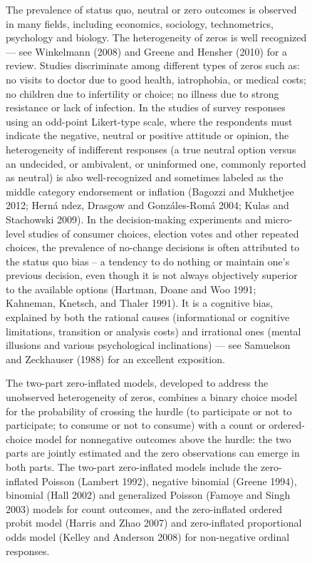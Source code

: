 \documentclass[letterpaper,fleqn,12pt]{article}
\begin{document}
\begin{figure}[H]
\begin{onehalfspace}
The prevalence of status quo, neutral or zero outcomes is observed in many
fields, including economics, sociology, technometrics, psychology and
biology. The heterogeneity of zeros is well recognized --- see Winkelmann
(2008) and Greene and Hensher (2010) for a review. Studies discriminate
among different types of zeros such as: no visits to doctor due to good
health, iatrophobia, or medical costs; no children due to infertility or
choice; no illness due to strong resistance or lack of infection. In the
studies of survey responses using an odd-point Likert-type scale, where the
respondents must indicate the negative, neutral or positive attitude or
opinion, the heterogeneity of indifferent responses (a true neutral option
versus an undecided, or ambivalent, or uninformed one, commonly reported as
neutral) is also well-recognized and sometimes labeled as the middle
category endorsement or inflation (Bagozzi and Mukhetjee 2012; Hern\'{a}%
ndez, Drasgow and Gonz\'{a}les-Rom\'{a} 2004; Kulas and Stachowski 2009). In
the decision-making experiments and micro-level studies of consumer choices,
election votes and other repeated choices, the prevalence of no-change
decisions is often attributed to the status quo bias -- a tendency to do
nothing or maintain one's previous decision, even though it is not always
objectively superior to the available options (Hartman, Doane and Woo 1991;
Kahneman, Knetsch, and Thaler 1991). It is a cognitive bias, explained by
both the rational causes (informational or cognitive limitations, transition
or analysis costs) and irrational ones (mental illusions and various
psychological inclinations) --- see Samuelson and Zeckhauser (1988) for an
excellent exposition.

The two-part zero-inflated models, developed to address the unobserved
heterogeneity of zeros, combines a binary choice model for the probability
of crossing the hurdle (to participate or not to participate; to consume or
not to consume) with a count or ordered-choice model for nonnegative
outcomes above the hurdle: the two parts are jointly estimated and the zero
observations can emerge in both parts. The two-part zero-inflated models
include the zero-inflated Poisson (Lambert 1992), negative binomial (Greene
1994), binomial (Hall 2002) and generalized Poisson (Famoye and Singh 2003)
models for count outcomes, and the zero-inflated ordered probit model
(Harris and Zhao 2007) and zero-inflated proportional odds model (Kelley and
Anderson 2008) for non-negative ordinal responses.


\end{onehalfspace}
\end{figure}
\end{document}
